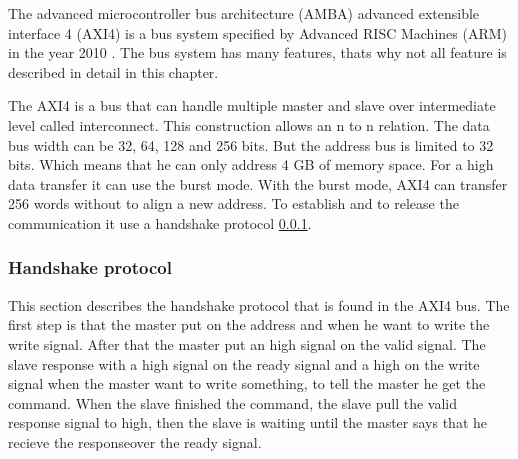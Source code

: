  
The  advanced microcontroller bus architecture (AMBA) advanced extensible interface 4 (AXI4) is a bus system specified by Advanced RISC Machines (ARM) in the year 2010 \cite{6129797}. The bus system has many features, thats why not all feature is described in detail in this chapter.

The AXI4 is a bus that can handle multiple master and slave over intermediate level called interconnect. This construction allows an n to n relation. The data bus width can be 32, 64, 128 and 256 bits. But the address bus is limited to 32 bits. Which means that he can only address 4 GB of memory space. For a high data transfer it can use the burst mode. With the burst mode, AXI4 can transfer 256 words without to align a new address. To establish and to release the communication it use a handshake protocol \cref{section:handshake}\cite{6129797}. 

\subsubsection{Handshake protocol}
\label{section:handshake}
This section describes the handshake protocol that is found in the AXI4 bus. The first step is that the master put on the address and when he want to write the write signal. After that the master put an high signal on the valid signal. The slave response with a high signal on the ready signal and a high on the write signal when the master want to write something, to tell the master he get the command. When the slave finished the command, the slave pull the valid response signal to high, then the slave is waiting until the master says that he recieve the responseover the ready signal.


